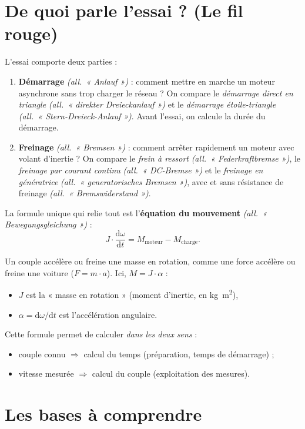 \documentclass[11pt,a4paper]{article}
\newcommand{\de}[1]{\textit{(all.\ « #1 »)}}
\begin{document}
\section{De quoi parle l'essai ? (Le fil rouge)}
L'essai comporte deux parties :
\begin{enumerate}
\item \textbf{Démarrage} \de{Anlauf} : comment mettre en marche un moteur asynchrone sans trop
  charger le réseau ? On compare le \emph{démarrage direct en triangle}
  \de{direkter Dreieckanlauf} et le \emph{démarrage étoile-triangle}
  \de{Stern-Dreieck-Anlauf}. Avant l'essai, on calcule la durée du démarrage.
\item \textbf{Freinage} \de{Bremsen} : comment arrêter rapidement un moteur avec volant d'inertie ?
  On compare le \emph{frein à ressort} \de{Federkraftbremse}, le \emph{freinage par courant
  continu} \de{DC-Bremse} et le \emph{freinage en génératrice} \de{generatorisches Bremsen},
  avec et sans résistance de freinage \de{Bremswiderstand}.
\end{enumerate}
La formule unique qui relie tout est l'\textbf{équation du mouvement} \de{Bewegungsgleichung} :
\[
  J\cdot\frac{\mathrm d\omega}{\mathrm dt} = M_\mathrm{moteur} - M_\mathrm{charge}.
\]
\begin{einfach}
Un couple accélère ou freine une masse en rotation, comme une force accélère ou freine
une voiture ($F = m\cdot a$). Ici, $M = J\cdot\alpha$ :
\begin{itemize}
\item $J$ est la « masse en rotation » (moment d'inertie, en \si{kg.m^2}),
\item $\alpha = \mathrm d\omega/\mathrm dt$ est l'accélération angulaire.
\end{itemize}
Cette formule permet de calculer \emph{dans les deux sens} :
\begin{itemize}
\item couple connu $\Rightarrow$ calcul du temps (préparation, temps de démarrage) ;
\item vitesse mesurée $\Rightarrow$ calcul du couple (exploitation des mesures).
\end{itemize}
\end{einfach}

\section{Les bases à comprendre}
\end{document}
